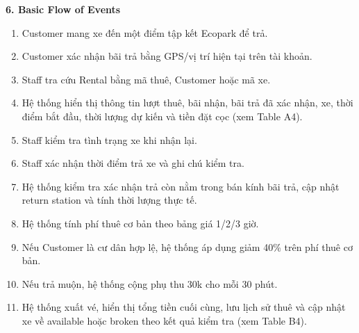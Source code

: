 \textbf{6. Basic Flow of Events}
\begin{enumerate}
  \item Customer mang xe đến một điểm tập kết Ecopark để trả.
  \item Customer xác nhận bãi trả bằng GPS/vị trí hiện tại trên tài khoản.
  \item Staff tra cứu Rental bằng mã thuê, Customer hoặc mã xe.
  \item Hệ thống hiển thị thông tin lượt thuê, bãi nhận, bãi trả đã xác nhận, xe, thời điểm bắt đầu, thời lượng dự kiến và tiền đặt cọc (xem Table A4).
  \item Staff kiểm tra tình trạng xe khi nhận lại.
  \item Staff xác nhận thời điểm trả xe và ghi chú kiểm tra.
  \item Hệ thống kiểm tra xác nhận trả còn nằm trong bán kính bãi trả, cập nhật return station và tính thời lượng thực tế.
  \item Hệ thống tính phí thuê cơ bản theo bảng giá 1/2/3 giờ.
  \item Nếu Customer là cư dân hợp lệ, hệ thống áp dụng giảm 40\% trên phí thuê cơ bản.
  \item Nếu trả muộn, hệ thống cộng phụ thu 30k cho mỗi 30 phút.
  \item Hệ thống xuất vé, hiển thị tổng tiền cuối cùng, lưu lịch sử thuê và cập nhật xe về available hoặc broken theo kết quả kiểm tra (xem Table B4).
\end{enumerate}

